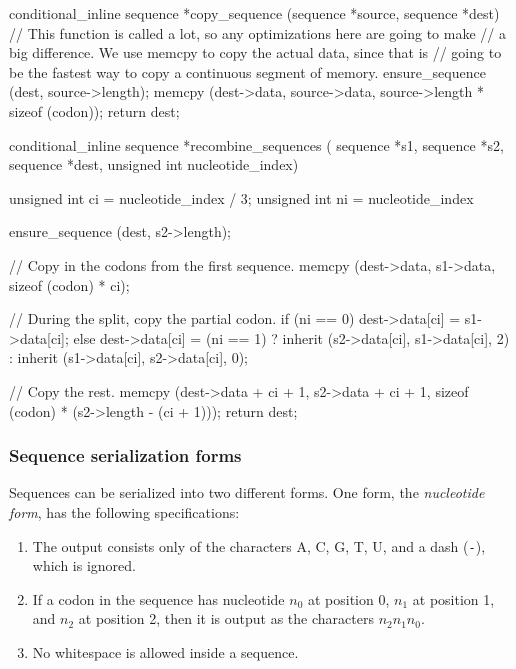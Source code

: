 \documentclass{article}
\begin{document}
\begin{ccode}
conditional_inline sequence *copy_sequence (sequence *source, sequence *dest) {
  // This function is called a lot, so any optimizations here are going to make
  // a big difference. We use memcpy to copy the actual data, since that is
  // going to be the fastest way to copy a continuous segment of memory.
  ensure_sequence (dest, source->length);
  memcpy (dest->data, source->data, source->length * sizeof (codon));
  return dest;
}

conditional_inline sequence *recombine_sequences (
    sequence *s1, sequence *s2, sequence *dest, unsigned int nucleotide_index) {
  unsigned int ci = nucleotide_index / 3;
  unsigned int ni = nucleotide_index %

  ensure_sequence (dest, s2->length);

  // Copy in the codons from the first sequence.
  memcpy (dest->data, s1->data, sizeof (codon) * ci);

  // During the split, copy the partial codon.
  if (ni == 0)
    dest->data[ci] = s1->data[ci];
  else
    dest->data[ci] = (ni == 1) ? inherit (s2->data[ci], s1->data[ci], 2) :
				 inherit (s1->data[ci], s2->data[ci], 0);

  // Copy the rest.
  memcpy (dest->data + ci + 1, s2->data + ci + 1, sizeof (codon) * (s2->length - (ci + 1)));
  return dest;
}
\end{ccode}

      \subsubsection{Sequence serialization forms}
	\label{sec:sequence-forms}

	Sequences can be serialized into two different forms. One form, the {\em
	nucleotide form}, has the following specifications:

	\begin{enumerate}
	  \item The output consists only of the characters A, C, G, T, U, and
	  a dash (\verb|-|), which is ignored.

	  \item If a codon in the sequence has nucleotide $n_0$ at position 0,
	  $n_1$ at position 1, and $n_2$ at position 2, then it is output as the
	  characters $n_2 n_1 n_0$.

	  \item No whitespace is allowed inside a sequence.
	\end{enumerate}
\end{document}
